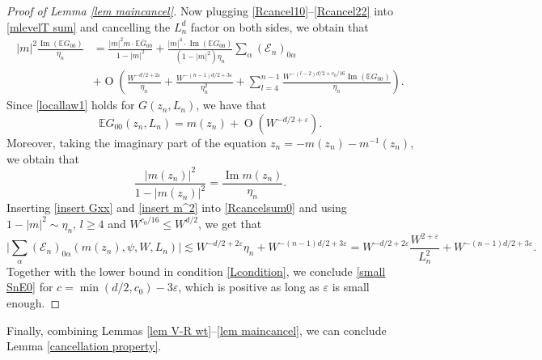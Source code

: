 \documentclass{article}
\newcommand{\1}{\mathds{1}}
\numberwithin{equation}{section}
\newcommand{\al}{\alpha}
\newcommand{\be}{\begin{equation}}
\newcommand{\ee}{\end{equation}}
\newcommand{\e}{{\varepsilon}}
\renewcommand{\leq}{\leqslant}
\renewcommand{\geq}{\geqslant}
\renewcommand{\le}{\leq}
\renewcommand{\ge}{\geq}
\newcommand{\E}{\mathbb{E}}
\DeclareMathOperator{\im}{Im}
\DeclareMathOperator{\OO}{O}
\theoremstyle{plain} %
\theoremstyle{remark}
\newcommand{\Sele}{{\mathcal E}}
\begin{document}
\begin{proof}[Proof of Lemma \ref{lem maincancel}]
Now plugging \eqref{Rcancel10}--\eqref{Rcancel22} into \eqref{mlevelT sum} and cancelling the $L^d_n$ factor on both sides, we obtain that
\begin{align}
  |m|^2 \frac{ \im \left(\mathbb EG_{00}\right)}{\eta_n} &=  \frac{|m|^2 m \cdot \mathbb E \overline G_{00}}{1-|m|^2}  +  \frac{|m|^4\cdot\im\left( \mathbb E G_{00}\right)}{(1-|m|^2)\eta_n}\sum_{\al} \left(\Sele_{n} \right)_{0\al } \label{Rcancelsum0}\\
&+   \OO \left(  \frac{W^{-d/2+2\e}}{\eta_n}+\frac{W^{-(n -1 )d/2+3\e}}{\eta_n^2} +\sum_{ l=4}^{n-1} \frac{W^{-(l -2)d/2+c_0/16}\im \left( \mathbb E G_{00}\right)}{\eta_n}\right) .\nonumber
\end{align}
Since \eqref{locallaw1} holds for $G(z_n,  L_n)$, we have that
\be\label{insert Gxx}\E G_{00}(z_n,  L_n)=m(z_n)+\OO(W^{-d/2+\e}).\ee 
Moreover, taking the imaginary part of the equation $z_n=-m(z_n)-m^{-1}(z_n)$, we obtain that 
\be\label{insert m^2}\frac{|m(z_n)|^2}{1-|m(z_n)|^2}  = \frac{ \im m(z_n)}{\eta_n} .\ee
Inserting \eqref{insert Gxx} and \eqref{insert m^2} into \eqref{Rcancelsum0} and using $1-|m|^2\sim \eta_n$, $l\ge 4$ and $W^{c_0/16}\le W^{d/2}$, we get that
$$\Big|\sum_{\al} (\Sele_{n} )_{0\al } (m(z_n),\psi, W, L_n) \Big|\lesssim   W^{-d/2+2\e}\eta_n + W^{-(n-1)d/2+3\e} = W^{-d/2+2\e}\frac{W^{2+\e}}{L_n^2} + W^{-(n-1)d/2+3\e}.$$
Together with the lower bound in condition \eqref{Lcondition}, we conclude \eqref{small SnE0} for $c= \min(d/2, c_0)-3\e$, which is positive as long as $\e$ is small enough.
 \end{proof}
 
Finally, combining Lemmas \ref{lem V-R wt}--\ref{lem maincancel}, we can conclude Lemma \ref{cancellation property}.
\end{document}
